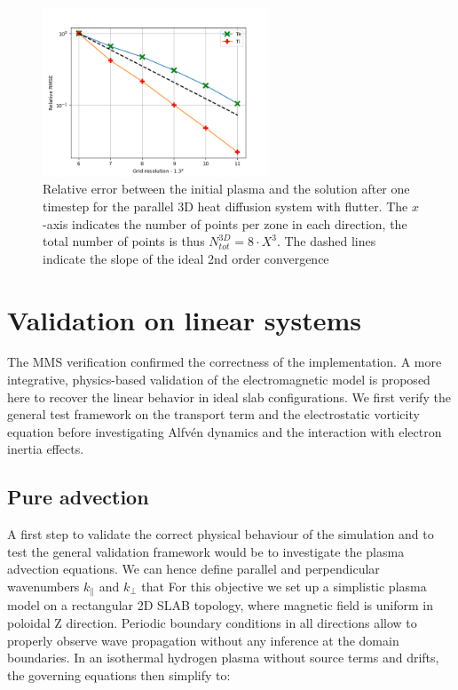 \begin{figure}[H]
	\centering
	\includegraphics[width=0.6\textwidth]{schemes/err_rel_paradif_Brad_grid2_3D.png}
	\caption[Relative error between the initial plasma and the solution after one timestep for the parallel 3D heat diffusion system with flutter]{Relative error between the initial plasma and the solution after one timestep for the parallel 3D heat diffusion system with flutter. The $x$-axis indicates the number of points per zone in each direction, the total number of points is thus $N_{tot}^{3D} = 8\cdot X^3$. The dashed lines indicate the slope of the ideal 2nd order convergence}
	\label{fig:MMSTorturedFlutterDiffParaConvergence}
\end{figure}




\section{Validation on linear systems}
\label{sec:validation}
The MMS verification confirmed the correctness of the implementation. A more integrative, physics-based validation of the electromagnetic model is proposed here to recover the linear behavior in ideal slab configurations. We first verify the general test framework on the transport term and the electrostatic vorticity equation before investigating Alfvén dynamics and the interaction with electron inertia effects.


\subsection{Pure advection}
A first step to validate the correct physical behaviour of the simulation and to test the general validation framework would be to investigate the plasma advection equations. We can hence define parallel and perpendicular wavenumbers $k_\parallel$ and $k_\perp$ that  For this objective we set up a simplistic plasma model on a rectangular 2D SLAB topology, where magnetic field is uniform in poloidal Z direction. Periodic boundary conditions in all directions allow to properly observe wave propagation without any inference at the domain boundaries. In an isothermal hydrogen plasma without source terms and drifts, the governing equations then simplify to:

